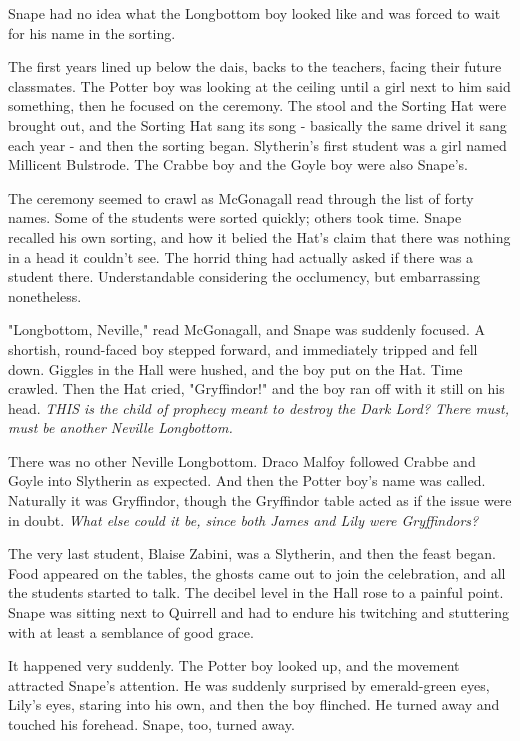 \documentclass[a4paper,11pt]{article}
\begin{document}
Snape had no idea what the Longbottom boy looked like and was forced to wait for his name in the sorting.

The first years lined up below the dais, backs to the teachers, facing their future classmates. The Potter boy was looking at the ceiling until a girl next to him said something, then he focused on the ceremony. The stool and the Sorting Hat were brought out, and the Sorting Hat sang its song - basically the same drivel it sang each year - and then the sorting began. Slytherin's first student was a girl named Millicent Bulstrode. The Crabbe boy and the Goyle boy were also Snape's.

The ceremony seemed to crawl as McGonagall read through the list of forty names. Some of the students were sorted quickly; others took time. Snape recalled his own sorting, and how it belied the Hat's claim that there was nothing in a head it couldn't see. The horrid thing had actually asked if there was a student there. Understandable considering the occlumency, but embarrassing nonetheless.

"Longbottom, Neville," read McGonagall, and Snape was suddenly focused. A shortish, round-faced boy stepped forward, and immediately tripped and fell down. Giggles in the Hall were hushed, and the boy put on the Hat. Time crawled. Then the Hat cried, "Gryffindor!" and the boy ran off with it still on his head. \emph{THIS is the child of prophecy meant to destroy the Dark Lord? There must, must be another Neville Longbottom.}

There was no other Neville Longbottom. Draco Malfoy followed Crabbe and Goyle into Slytherin as expected. And then the Potter boy's name was called. Naturally it was Gryffindor, though the Gryffindor table acted as if the issue were in doubt. \emph{What else could it be, since both James and Lily were Gryffindors?}

The very last student, Blaise Zabini, was a Slytherin, and then the feast began. Food appeared on the tables, the ghosts came out to join the celebration, and all the students started to talk. The decibel level in the Hall rose to a painful point. Snape was sitting next to Quirrell and had to endure his twitching and stuttering with at least a semblance of good grace.

It happened very suddenly. The Potter boy looked up, and the movement attracted Snape's attention. He was suddenly surprised by emerald-green eyes, Lily's eyes, staring into his own, and then the boy flinched. He turned away and touched his forehead. Snape, too, turned away.
\end{document}
